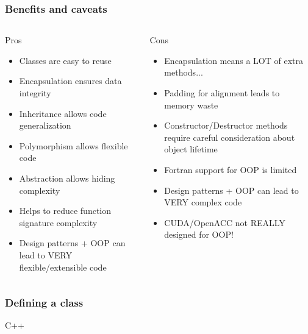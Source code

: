 \begin{frame}
	\frametitle{Benefits and caveats}
    \begin{columns}
            \begin{block}{Pros}
                \begin{itemize}
                    \item Classes are easy to reuse
                    \item Encapsulation ensures data integrity
                    \item Inheritance allows code generalization
                    \item Polymorphism allows flexible code
                    \item Abstraction allows hiding complexity
                    \item Helps to reduce function signature complexity
                    \item Design patterns + OOP can lead to VERY flexible/extensible code
                \end{itemize}
            \end{block}
            \begin{alertblock}{Cons}
                \begin{itemize}
                    \item Encapsulation means a LOT of extra methods...
                    \item Padding for alignment leads to memory waste
                    \item Constructor/Destructor methods require careful consideration about object lifetime
                    \item Fortran support for OOP is limited
                    \item Design patterns + OOP can lead to VERY complex code
                    \item CUDA/OpenACC not REALLY designed for OOP!
                \end{itemize}
            \end{alertblock}
    \end{columns}
\end{frame}

\begin{frame}
    \frametitle{Defining a class}
        \begin{block}{C++}
            
        \end{block}
\end{frame}


